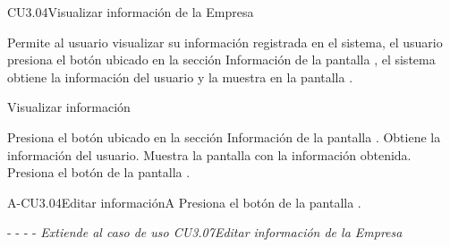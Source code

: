 
\begin{UseCase}{CU3.04}{Visualizar información de la Empresa}{
    Permite al usuario  visualizar su información registrada en el sistema, el usuario presiona el botón  ubicado en la sección Información de la pantalla , el sistema obtiene la información del usuario y la muestra en la pantalla .
       
    \bigskip
}
		
\end{UseCase}
	
	\begin{UCtrayectoria}{Visualizar información }
	
	    \UCpaso[\UCactor]Presiona el botón  ubicado en la sección Información de la pantalla .
		\UCpaso[\UCsist] Obtiene la información del usuario.
		\UCpaso[\UCsist] Muestra la pantalla con la información obtenida. 
        \UCpaso[\UCactor]Presiona el botón  de la pantalla .
		
	\end{UCtrayectoria}
	


	
	\begin{UCtrayectoriaA}{A-CU3.04}{Editar información}{A}
	    \UCpaso[\UCactor]Presiona el botón  de la pantalla .
	    \item[- -] - - {\em Extiende al caso de uso %
	    {CU3.07}{Editar información de la Empresa}} 
	\end{UCtrayectoriaA}
	
